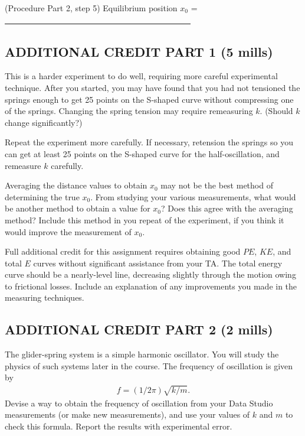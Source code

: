 \item (Procedure Part 2, step 5) Equilibrium position \(x_0\) = \ul{~~~~~~~~~~~~~~~~~~~~~~~~~~~~~~~~~~~~~~~~~~~~~}

\squishend

\subsection*{ADDITIONAL CREDIT PART 1 (5 mills)}

This is a harder experiment to do well, requiring more careful experimental technique.  After you started, you may have found that you had not tensioned the springs enough to get 25 points on the S-shaped curve without compressing one of the springs.  Changing the spring tension may require remeasuring \(k\).  (Should \(k\) change significantly?)

Repeat the experiment more carefully.  If necessary, retension the springs so you can get at least 25 points on the S-shaped curve for the half-oscillation, and remeasure \(k\) carefully.

Averaging the distance values to obtain \(x_0\) may not be the best method of determining the true \(x_0\).  From studying your various measurements, what would be another method to obtain a value for \(x_0\)?  Does this agree with the averaging method?  Include this method in you repeat of the experiment, if you think it would improve the measurement of \(x_0\).

Full additional credit for this assignment requires obtaining good \(PE\), \(KE\), and total \(E\) curves without significant assistance from your TA.  The total energy curve should be a nearly-level line, decreasing slightly through the motion owing to frictional losses.  Include an explanation of any improvements you made in the measuring techniques.

\subsection*{ADDITIONAL CREDIT PART 2 (2 mills)}

The glider-spring system is a simple harmonic oscillator.  You will study the physics of such systems later in the course.   The frequency of oscillation is given by
\begin{align} f = (1/2\pi)\sqrt{k/m}. \end{align}
Devise a way to obtain the frequency of oscillation from your Data Studio measurements (or make new measurements), and use your values of \(k\) and \(m\) to check this formula.  Report the results with experimental error.
